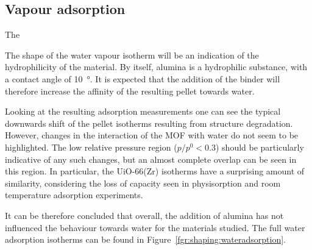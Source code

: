 
\subsection{Vapour adsorption}

The 

The shape of the water vapour isotherm will be an indication 
of the hydrophilicity of the material. By itself, 
alumina is a hydrophilic substance, with a contact 
angle of \SI{10}{\degree}. It is expected that the 
addition of the binder will therefore increase the affinity 
of the resulting pellet towards water.

Looking at the resulting adsorption measurements one can see the typical downwards
shift of the pellet isotherms resulting from structure degradation. However, changes
in the interaction of the MOF with water do not seem to be highlighted. The low relative
pressure region (\(p/p^0 < 0.3\)) should be particularly indicative of any such 
changes, but an almost complete overlap can be seen in this region.
In particular, the UiO-66(Zr) isotherms have a surprising amount of similarity,
considering the loss of capacity seen in  physisorption and room temperature 
adsorption experiments.

It can be therefore concluded that overall, the addition of alumina has not influenced 
the behaviour towards water for the materials studied. The full water adsorption isotherms
can be found in Figure~\ref{fgr:shaping:wateradsorption}.

